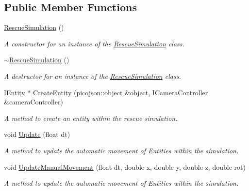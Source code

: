 \subsection*{Public Member Functions}
\begin{DoxyCompactItemize}
\item 
\mbox{\label{classRescueSimulation_ae649620f5bdc10bdc74860480ee0ac71}} 
\hyperlink{classRescueSimulation_ae649620f5bdc10bdc74860480ee0ac71}{Rescue\+Simulation} ()
\begin{DoxyCompactList}\small\item\em A constructor for an instance of the \hyperlink{classRescueSimulation}{Rescue\+Simulation} class. \end{DoxyCompactList}\item 
\mbox{\label{classRescueSimulation_a6db1aa5856a1eb244a9a24d38d10327e}} 
\hyperlink{classRescueSimulation_a6db1aa5856a1eb244a9a24d38d10327e}{$\sim$\+Rescue\+Simulation} ()
\begin{DoxyCompactList}\small\item\em A destructor for an instance of the \hyperlink{classRescueSimulation}{Rescue\+Simulation} class. \end{DoxyCompactList}\item 
\hyperlink{classIEntity}{I\+Entity} $\ast$ \hyperlink{classRescueSimulation_a38c93703a086b12bad9de7164047cffc}{Create\+Entity} (picojson\+::object \&object, \hyperlink{classICameraController}{I\+Camera\+Controller} \&camera\+Controller)
\begin{DoxyCompactList}\small\item\em A method to create an entity within the rescue simulation. \end{DoxyCompactList}\item 
void \hyperlink{classRescueSimulation_a6b9248fa229d3592a68096628ca654a2}{Update} (float dt)
\begin{DoxyCompactList}\small\item\em A method to update the automatic movement of Entities within the simulation. \end{DoxyCompactList}\item 
void \hyperlink{classRescueSimulation_aef3363ae3303a037fbb9faab87ab5a31}{Update\+Manual\+Movement} (float dt, double x, double y, double z, double rot)
\begin{DoxyCompactList}\small\item\em A method to update the automatic movement of Entities within the simulation. \end{DoxyCompactList}\item 

\end{DoxyCompactItemize}
